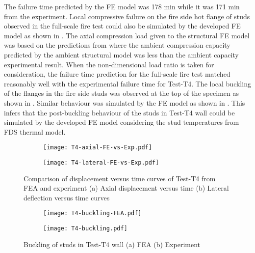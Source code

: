 The failure time predicted by the FE model was 178 min while it was 171 min from the experiment. Local compressive failure on the fire side hot flange of studs observed in the full-scale fire test could also be simulated by the developed FE model as shown in . The axial compression load given to the structural FE model was based on the predictions from  where the ambient compression capacity predicted by the ambient structural model was less than the ambient capacity experimental result. When the non-dimensional load ratio is taken for consideration, the failure time prediction for the full-scale fire test matched reasonably well with the experimental failure time for Test-T4. The local buckling of the flanges in the fire side studs was observed at the top of the specimen as shown in . Similar behaviour was simulated by the FE model as shown in . This infers that the post-buckling behaviour of the studs in Test-T4 wall could be simulated by the developed FE model considering the stud temperatures from FDS thermal model. 
\begin{figure}[!htbp]
	\centering
	\begin{subfigure}[b]{0.7\textwidth}
		\centering
		\texttt{[image: T4-axial-FE-vs-Exp.pdf]}
		\caption{}
		\label{subfig:T4-axial-FE-vs-Exp}
	\end{subfigure}
	\begin{subfigure}[b]{0.7\textwidth}
		\centering
		\texttt{[image: T4-lateral-FE-vs-Exp.pdf]}
		\caption{}
		\label{subfig:T4-lateral-FE-vs-Exp}
	\end{subfigure}
	   \caption{Comparison of displacement versus time curves of Test-T4 from FEA and experiment (a) Axial displacement versus time (b) Lateral deflection versus time curves}
	   \label{fig:T4-structural-FE-vs-Exp}
\end{figure} 
\begin{figure}[!htbp]
	\centering
	\begin{subfigure}[b]{0.8\textwidth}
		\centering
		\texttt{[image: T4-buckling-FEA.pdf]}
		\caption{}
		\label{subfig:T4-buckling-FEA}
	\end{subfigure}
	\begin{subfigure}[b]{0.3\textwidth}
		\centering
		\texttt{[image: T4-buckling.pdf]}
		\caption{}
		\label{subfig:T4-buckling-FEA-Exp}
	\end{subfigure}
	   \caption{Buckling of studs in Test-T4 wall (a) FEA (b) Experiment}
	   \label{fig:T4-buckling-FE-vs-Exp}
\end{figure} 


